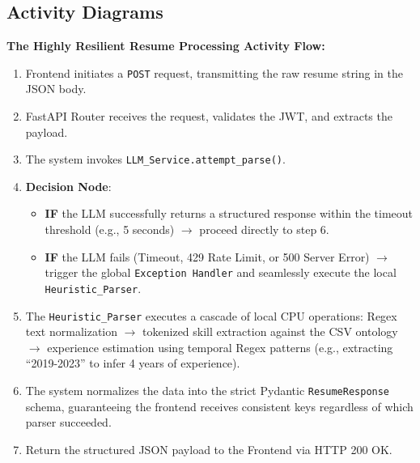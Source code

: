 \documentclass[12pt,a4paper]{report}
\begin{document}
\subsection{Activity Diagrams}
\textbf{The Highly Resilient Resume Processing Activity Flow:}
\begin{enumerate}
    \item Frontend initiates a \texttt{POST} request, transmitting the raw resume string in the JSON body.
    \item FastAPI Router receives the request, validates the JWT, and extracts the payload.
    \item The system invokes \texttt{LLM\_Service.attempt\_parse()}. 
    \item \textbf{Decision Node}: 
       \begin{itemize}
           \item \textbf{IF} the LLM successfully returns a structured response within the timeout threshold (e.g., 5 seconds) $\rightarrow$ proceed directly to step 6.
           \item \textbf{IF} the LLM fails (Timeout, 429 Rate Limit, or 500 Server Error) $\rightarrow$ trigger the global \texttt{Exception Handler} and seamlessly execute the local \texttt{Heuristic\_Parser}.
       \end{itemize}
    \item The \texttt{Heuristic\_Parser} executes a cascade of local CPU operations: Regex text normalization $\rightarrow$ tokenized skill extraction against the CSV ontology $\rightarrow$ experience estimation using temporal Regex patterns (e.g., extracting ``2019-2023'' to infer 4 years of experience).
    \item The system normalizes the data into the strict Pydantic \texttt{ResumeResponse} schema, guaranteeing the frontend receives consistent keys regardless of which parser succeeded.
    \item Return the structured JSON payload to the Frontend via HTTP 200 OK.
\end{enumerate}
\end{document}
